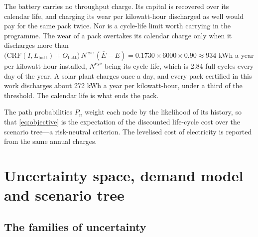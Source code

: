 \documentclass[11pt,a4paper]{article}
\theoremstyle{plain}
\theoremstyle{definition}
\newcommand{\CRF}{\mathrm{CRF}}
\begin{document}
The battery carries no throughput charge. Its capital is recovered over its calendar life,
and charging its wear per kilowatt-hour discharged as well would pay for the same pack
twice. Nor is a cycle-life limit worth carrying in the programme. The wear of a pack
overtakes its calendar charge only when it discharges more than
$\big(\CRF(I,L_{\mathrm{batt}})+O_{\mathrm{batt}}\big)\,N^{\mathrm{cyc}}\,
(\overline{E}-\underline{E}) = 0.1730\times6000\times0.90\approx934$ kWh a year per
kilowatt-hour installed, $N^{\mathrm{cyc}}$ being its cycle life, which is 2.84 full cycles
every day of the year. A solar plant charges once a day, and every pack certified in this
work discharges about 272 kWh a year per kilowatt-hour, under a third of the threshold. The
calendar life is what ends the pack.

The path probabilities $P_n$ weight each node by the likelihood of its history, so that
\eqref{eq:objective} is the expectation of the discounted life-cycle cost over the
scenario tree---a risk-neutral criterion. The levelised cost of electricity is reported
from the same annual charges.

\section{Uncertainty space, demand model and scenario tree}
\label{sec:scenarios}

\subsection{The families of uncertainty}
\label{sec:families}
\end{document}
